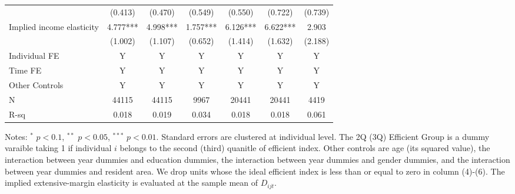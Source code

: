 \documentclass[ review  , 3p ]{elsarticle}
\begin{document}
\begin{table}
\begin{threeparttable}
\begin{tabular}[t]{lcccccc}
   & (0.413) & (0.470) & (0.549) & (0.550) & (0.722) & (0.739)\\
  Implied income elasticity & 4.777*** & 4.998*** & 1.757*** & 6.126*** & 6.622*** & 2.903\\
   & (1.002) & (1.107) & (0.652) & (1.414) & (1.632) & (2.188)\\
  Individual FE & Y & Y & Y & Y & Y & Y\\
  Time FE & Y & Y & Y & Y & Y & Y\\
  Other Controls & Y & Y & Y & Y & Y & Y\\
  N & 44115 & 44115 & 9967 & 20441 & 20441 & 4419\\
  R-sq & 0.018 & 0.019 & 0.034 & 0.018 & 0.018 & 0.061\\
  \bottomrule
  \end{tabular}
  \begin{tablenotes}
  \item Notes: $^{*}$ $p < 0.1$, $^{**}$ $p < 0.05$, $^{***}$ $p < 0.01$. Standard errors are clustered at individual level. The 2Q (3Q) Efficient Group is a dummy varaible taking 1 if individual $i$ belongs to the second (third) quanitle of efficient index. Other controls are age (its squared value), the interaction between year dummies and education dummies, the interaction between year dummies and gender dummies, and the interaction between year dummies and resident area. We drop units whose the ideal efficient index is less than or equal to zero in column (4)-(6). The implied extensive-margin elasticity is evaluated at the sample mean of $D_{ijt}$.
  \end{tablenotes}
  \end{threeparttable}
  \end{table}
  
\end{document}
